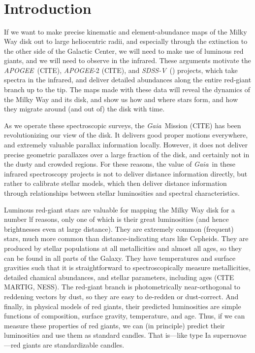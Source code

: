 \documentclass[modern]{aastex62}
\newcommand{\acronym}[1]{{\small{#1}}}
\newcommand{\project}[1]{\textsl{#1}}
\newcommand{\apogee}{\project{\acronym{APOGEE}}}
\newcommand{\gaia}{\project{Gaia}}
\newcommand{\sdssv}{\project{\acronym{SDSS-V}}}
\begin{document}

\section*{~}\clearpage
\section{Introduction} \label{sec:intro}

If we want to make precise kinematic and element-abundance maps
of the Milky Way disk out to large heliocentric radii,
and especially through the extinction to the other side of the Galactic Center, we will
need to make use of luminous red giants, and we will need to observe in
the infrared.
These arguments motivate the \apogee\ (CITE), \apogee-2 (CITE), and \sdssv\ (\citealt{sdssv})
projects, which take spectra in the infrared, and deliver detailed abundances
along the entire red-giant branch up to the tip.
The maps made with these data will reveal the dynamics of the Milky Way and its disk,
and show us how and where stars form, and how they migrate around (and out of) the
disk with time.

As we operate these spectroscopic surveys,
the \gaia\ Mission (CITE) has been revolutionizing our view of the disk.
It delivers good proper motions everywhere,
and extremely valuable parallax information
locally.
However, it does not deliver precise geometric parallaxes over a large fraction of
the disk, and certainly not in the dusty and crowded regions.
For these reasons, the value of \gaia\ in these infrared spectroscopy projects is not
to deliver distance information directly, but rather to calibrate stellar models,
which then deliver distance information through relationships between stellar
luminosities and spectral characteristics.

Luminous red-giant stars are valuable for mapping the Milky Way disk for a number
lf reasons, only one of which is their great luminosities (and hence brightnesses
even at large distance).
They are extremely common (frequent) stars, much more common than distance-indicating
stars like Cepheids.
They are produced by stellar populations at all metallicities and almost all ages,
so they can be found in all parts of the Galaxy.
They have temperatures and surface gravities such that it is
straightforward to spectroscopically measure metallicities,
detailed chamical abundances, and stellar parameters, including ages (CITE MARTIG, NESS).
The red-giant branch is photometrically near-orthogonal to reddening vectors by dust,
so they are easy to de-redden or dust-correct.
And finally, in physical models of red giants, their predicted luminosities are simple
functions of composition, surface gravity, temperature, and age.
Thus, if we can measure these properties of red giants, we can (in principle) predict
their luminosities and use them as standard candles.
That is---like type Ia supernovae---red giants are standardizable candles.
\end{document}
